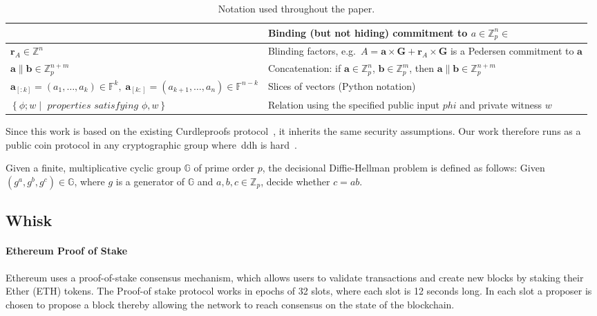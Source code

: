 \begin{table*}[!htb]
\begin{tabular}{|l|l|}
        & Binding (but not hiding) commitment to $a\in\mathbb{Z}_p^n\in $ \\
        \hline
        $\mathbf{r}_A\in\mathbb{Z}^n$ & Blinding factors, e.g.\ $A=\mathbf{a}\times\mathbf{G} + \mathbf{r}_A \times \mathbf{G}$ is a Pedersen commitment to $\mathbf{a}$ \\
        \hline
        $\mathbf{a}\parallel \mathbf{b}\in\mathbb{Z}_p^{n+m}$
        & Concatenation: if $\mathbf{a}\in\mathbb{Z}_p^n$, $\mathbf{b}\in\mathbb{Z}_p^m$, then $\mathbf{a}\parallel \mathbf{b}\in\mathbb{Z}_p^{n+m}$ \\
        \hline
        $\mathbf{a}_{[:k]}=(a_1,\dots,a_k)\in\mathbb{F}^k, \; \mathbf{a}_{[k:]}=(a_{k+1},\dots,a_n)\in\mathbb{F}^{n-k}$
        & Slices of vectors (Python notation) \\
        \hline
        $\left\{\phi; w\middle|\textit{ properties satisfying }\phi,w\right\}$
        & Relation using the specified public input $phi$ and private witness $w$ \\
        \hline
    \end{tabular}
    \caption{Notation used throughout the paper.}
    \label{tab:notation}
\end{table*}


Since this work is based on the existing Curdleproofs protocol~\cite{Curdleproofs}, it inherits the same security assumptions.
Our work therefore runs as a public coin protocol in any cryptographic group where~\gls{ddh} is hard~\cite{10.1007/BFb0054851}.

\begin{definition}[DDH]
 Given a finite, multiplicative cyclic group $\mathbb{G}$ of prime order $p$, the decisional Diffie-Hellman problem is defined as follows: Given $(g^a,g^b,g^c)\in\mathbb{G}$, where $g$ is a generator of $\mathbb{G}$ and $a,b,c\in\mathbb{Z}_p$, decide whether $c=ab$.
\end{definition}

\subsection{Whisk}\label{subsec:related-work-whisk}

\paragraph*{\textbf{Ethereum Proof of Stake}}\label{par:background-ethereum}
Ethereum uses a proof-of-stake consensus mechanism, which allows users to validate transactions and create new blocks by staking their Ether (ETH) tokens.
The Proof-of stake protocol works in epochs of 32 slots, where each slot is 12 seconds long.
In each slot a proposer is chosen to propose a block thereby allowing the network to reach consensus on the state of the blockchain.


